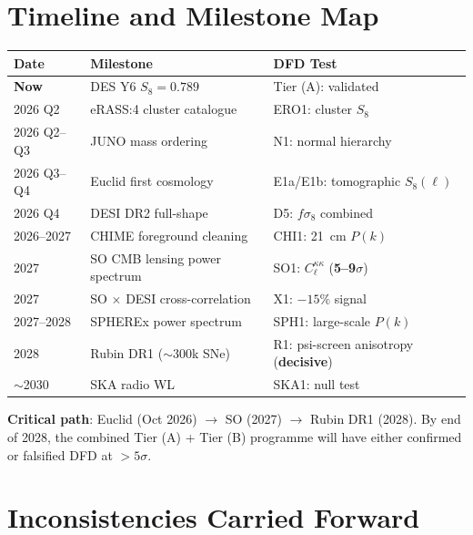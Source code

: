 \documentclass[11pt,a4paper]{article}
\begin{document}
\section{Timeline and Milestone Map}
\label{sec:timeline}

\begin{center}
\begin{tabular}{lll}
\toprule
\textbf{Date} & \textbf{Milestone} & \textbf{DFD Test} \\
\midrule
\textbf{Now} & DES Y6 $S_8 = 0.789$ & Tier (A): validated \\
2026 Q2 & eRASS:4 cluster catalogue & ERO1: cluster $S_8$ \\
2026 Q2--Q3 & JUNO mass ordering & N1: normal hierarchy \\
2026 Q3--Q4 & Euclid first cosmology & E1a/E1b: tomographic $S_8(\ell)$ \\
2026 Q4 & DESI DR2 full-shape & D5: $f\sigma_8$ combined \\
2026--2027 & CHIME foreground cleaning & CHI1: 21~cm $P(k)$ \\
2027 & SO CMB lensing power spectrum & SO1: $C_\ell^{\kappa\kappa}$
  (\textbf{5--9$\sigma$}) \\
2027 & SO $\times$ DESI cross-correlation & X1: $-15\%$ signal \\
2027--2028 & SPHEREx power spectrum & SPH1: large-scale $P(k)$ \\
2028 & Rubin DR1 ($\sim$300k SNe) & R1: psi-screen anisotropy
  (\textbf{decisive}) \\
$\sim$2030 & SKA radio WL & SKA1: null test \\
\bottomrule
\end{tabular}
\end{center}

\textbf{Critical path}: Euclid (Oct 2026) $\to$ SO (2027) $\to$
Rubin DR1 (2028). By end of 2028, the combined Tier (A) + Tier (B)
programme will have either confirmed or falsified DFD at
$> 5\sigma$.


\section{Inconsistencies Carried Forward}
\label{sec:inconsistencies}
\end{document}
